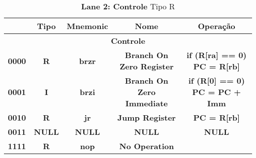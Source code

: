\documentclass{article}
\begin{document}
    \begin{table}[H]
      \centering
      \captionsetup{labelformat=empty, skip=0pt}
      \caption{\textbf{Lane 2: Controle} Tipo R}
      \noindent\hspace*{-2.5cm}%
      \begin{tabular}{|c|*{4}{c|}}
        \hline
        \rowcolor{gray!50}
        \multicolumn{1}{|c|}{\textbf{Opcode}} & \multicolumn{1}{|c|}{\textbf{Tipo}} & \multicolumn{1}{|c|}{\textbf{Mnemonic}} & \multicolumn{1}{|c|}{\textbf{Nome}}                    & \multicolumn{1}{|c|}{\textbf{Operação}}  \\ \hline
        \multicolumn{5}{|c|}{\textbf{Controle}} \\ \hline 
        \multicolumn{1}{|c|}{\textbf{0000}}    & \multicolumn{1}{c|}{\textbf{R}}    & \multicolumn{1}{c|}{\textbf{brzr}}      & \multicolumn{1}{c|}{\textbf{Branch On Zero Register}} & \multicolumn{1}{c|}{\textbf{if (R[ra] == 0) PC = R[rb]}}  \\ \hline
        \multicolumn{1}{|c|}{\textbf{0001}}    & \multicolumn{1}{c|}{\textbf{I}}    & \multicolumn{1}{c|}{\textbf{brzi}}        & \multicolumn{1}{c|}{\textbf{Branch On Zero Immediate}}          & \multicolumn{1}{c|}{\textbf{if (R[0] == 0) PC = PC + Imm}}  \\ \hline
        \multicolumn{1}{|c|}{\textbf{0010}}    & \multicolumn{1}{c|}{\textbf{R}}    & \multicolumn{1}{c|}{\textbf{jr}}        & \multicolumn{1}{c|}{\textbf{Jump Register}}                    & \multicolumn{1}{c|}{\textbf{PC = R[rb]}}  \\ \hline
        \multicolumn{1}{|c|}{\textbf{0011}}    & \multicolumn{1}{c|}{\textbf{NULL}} & \multicolumn{1}{c|}{\textbf{NULL}}        & \multicolumn{1}{c|}{\textbf{NULL}}                   & \multicolumn{1}{c|}{\textbf{NULL}}  \\ \hline
        \multicolumn{1}{|c|}{\textbf{1111}}    & \multicolumn{1}{c|}{\textbf{R}}    & \multicolumn{1}{c|}{\textbf{nop}}       & \multicolumn{1}{c|}{\textbf{No Operation}}   & \multicolumn{1}{c|}{\textbf{}}  \\ \hline
      \end{tabular}
    \end{table}
\end{document}

